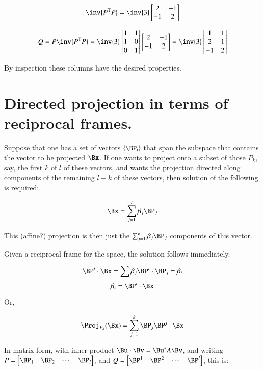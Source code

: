 \documentclass{article}      %
\newcommand{\T}[0]{\text{T}}
\begin{document}
\[
\inv{P^\T P} = 
\inv{3}
\begin{bmatrix}
2 & -1 \\
-1 & 2 \\
\end{bmatrix}
\]

\[
Q = P \inv{P^\T P} = 
\inv{3}
\begin{bmatrix}
1 & 1 \\
1 & 0 \\
0 & 1 \\
\end{bmatrix}
\begin{bmatrix}
2 & -1 \\
-1 & 2 \\
\end{bmatrix}
=
\inv{3}
\begin{bmatrix}
1 & 1 \\
2 & 1 \\
-1 & 2 \\
\end{bmatrix}
\]

By inspection these columns have the desired properties.

\section{ Directed projection in terms of reciprocal frames. }

Suppose that one has a set of vectors $\{\BP_i\}$ that span the subspace that contains the vector
to be projected $\Bx$.   If one wants to project onto a subset of those $P_k$,
say, the first $k$ of $l$ of these vectors, and wants the projection directed along components
of the remaining $l-k$ of these vectors, then solution of the following is required:

\begin{equation*}
\Bx = \sum_{j=1}^{l} \beta_j \BP_j
\end{equation*}

This (affine?) projection is then just the $\sum_{j=1}^k \beta_j \BP_j$ components of this vector.

Given a reciprocal frame for the space, the solution follows immediately.

\[
\BP^i \cdot \Bx = \sum \beta_j \BP^i \cdot \BP_j = \beta_i
\]
\[
\beta_i = \BP^i \cdot \Bx
\]

Or, 

\[
\Proj_{P_k}(\Bx) = \sum_{j=1}^k \BP_j \BP^j \cdot \Bx
\]

In matrix form, with inner product $\Bu \cdot \Bv = \Bu^* A \Bv$, and writing 
$P = 
\begin{bmatrix}
\BP_1 & \BP_2 & \cdots & \BP_l
\end{bmatrix}$, and $Q =
\begin{bmatrix}
\BP^1 & \BP^2 & \cdots & \BP^l
\end{bmatrix}$,
this is:
\end{document}
